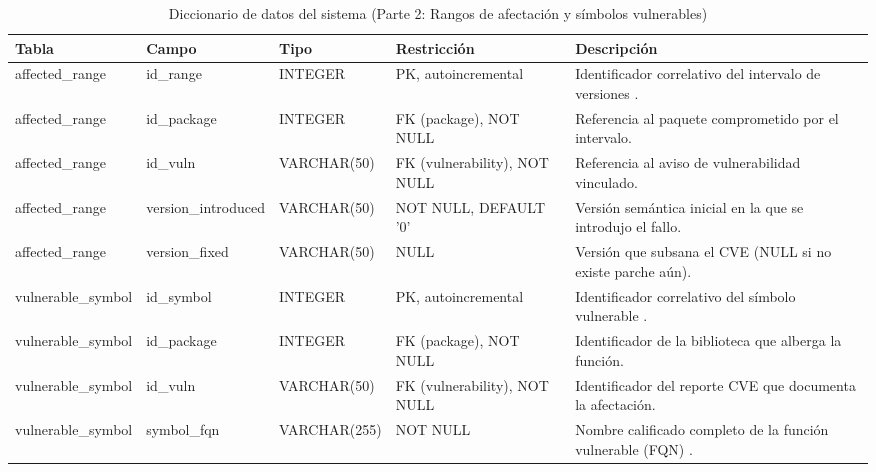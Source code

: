\begin{table}[H]
\centering
\caption{Diccionario de datos del sistema (Parte 2: Rangos de afectación y símbolos vulnerables)}
\label{p6:tab:diccionario_datos_p2}
\footnotesize
\singlespacing
\setlength{\tabcolsep}{3.5pt}
\begin{tabularx}{\textwidth}{>{\raggedright\arraybackslash}p{2.3cm} >{\raggedright\arraybackslash}p{2.5cm} >{\raggedright\arraybackslash}p{1.9cm} >{\raggedright\arraybackslash}p{2.7cm} >{\raggedright\arraybackslash}X}
\toprule
\textbf{Tabla} & \textbf{Campo} & \textbf{Tipo} & \textbf{Restricción} & \textbf{Descripción} \\
\midrule
affected\_\newline range & id\_range & INTEGER & PK, autoincremental & Identificador correlativo del intervalo de versiones \cite{torres2026proyecto}. \\
affected\_\newline range & id\_package & INTEGER & FK (package), NOT NULL & Referencia al paquete comprometido por el intervalo. \\
affected\_\newline range & id\_vuln & VARCHAR\allowbreak (50) & FK (vulnerability), NOT NULL & Referencia al aviso de vulnerabilidad vinculado. \\
affected\_\newline range & version\_\newline introduced & VARCHAR\allowbreak (50) & NOT NULL, DEFAULT '0' & Versión semántica inicial en la que se introdujo el fallo. \\
affected\_\newline range & version\_\newline fixed & VARCHAR\allowbreak (50) & NULL & Versión que subsana el CVE (NULL si no existe parche aún). \\
\addlinespace
vulnerable\_\newline symbol & id\_symbol & INTEGER & PK, autoincremental & Identificador correlativo del símbolo vulnerable \cite{torres2026proyecto}. \\
vulnerable\_\newline symbol & id\_package & INTEGER & FK (package), NOT NULL & Identificador de la biblioteca que alberga la función. \\
vulnerable\_\newline symbol & id\_vuln & VARCHAR\allowbreak (50) & FK (vulnerability), NOT NULL & Identificador del reporte CVE que documenta la afectación. \\
vulnerable\_\newline symbol & symbol\_fqn & VARCHAR\allowbreak (255) & NOT NULL & Nombre calificado completo de la función vulnerable (FQN) \cite{salis2021pycg}. \\
\bottomrule
\end{tabularx}
\end{table}

